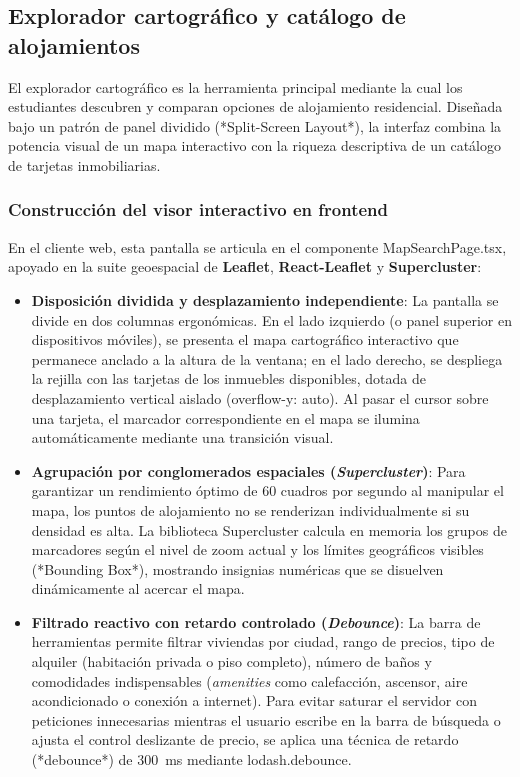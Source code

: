 \subsection{Explorador cartográfico y catálogo de alojamientos}
\label{subsec:explorador_alojamientos}

El explorador cartográfico es la herramienta principal mediante la cual los estudiantes descubren y comparan opciones de alojamiento residencial. Diseñada bajo un patrón de panel dividido (*Split-Screen Layout*), la interfaz combina la potencia visual de un mapa interactivo con la riqueza descriptiva de un catálogo de tarjetas inmobiliarias.

\subsubsection{Construcción del visor interactivo en frontend}

En el cliente web, esta pantalla se articula en el componente MapSearchPage.tsx, apoyado en la suite geoespacial de \textbf{Leaflet}, \textbf{React-Leaflet} y \textbf{Supercluster}:

\begin{itemize}
    \item \textbf{Disposición dividida y desplazamiento independiente}: La pantalla se divide en dos columnas ergonómicas. En el lado izquierdo (o panel superior en dispositivos móviles), se presenta el mapa cartográfico interactivo que permanece anclado a la altura de la ventana; en el lado derecho, se despliega la rejilla con las tarjetas de los inmuebles disponibles, dotada de desplazamiento vertical aislado (overflow-y: auto). Al pasar el cursor sobre una tarjeta, el marcador correspondiente en el mapa se ilumina automáticamente mediante una transición visual.
    \item \textbf{Agrupación por conglomerados espaciales (\emph{Supercluster})}: Para garantizar un rendimiento óptimo de 60 cuadros por segundo al manipular el mapa, los puntos de alojamiento no se renderizan individualmente si su densidad es alta. La biblioteca Supercluster calcula en memoria los grupos de marcadores según el nivel de zoom actual y los límites geográficos visibles (*Bounding Box*), mostrando insignias numéricas que se disuelven dinámicamente al acercar el mapa.
    \item \textbf{Filtrado reactivo con retardo controlado (\emph{Debounce})}: La barra de herramientas permite filtrar viviendas por ciudad, rango de precios, tipo de alquiler (habitación privada o piso completo), número de baños y comodidades indispensables (\emph{amenities} como calefacción, ascensor, aire acondicionado o conexión a internet). Para evitar saturar el servidor con peticiones innecesarias mientras el usuario escribe en la barra de búsqueda o ajusta el control deslizante de precio, se aplica una técnica de retardo (*debounce*) de 300~ms mediante lodash.debounce.
\end{itemize}

